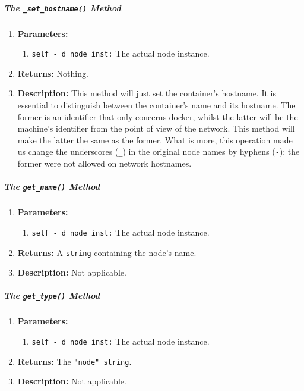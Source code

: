         \subparagraph{The \texttt{\_set\_hostname()} Method}
            \begin{enumerate}
                \item \textbf{Parameters:}
                \begin{enumerate}
                    \item \texttt{self - d\_node\_inst:} The actual node instance.
                \end{enumerate}
                \item \textbf{Returns:} Nothing.
                \item \textbf{Description:} This method will just set the container's hostname. It is essential to distinguish between the container's name and its hostname. The former is an identifier that only concerns docker, whilst the latter will be the machine's identifier from the point of view of the network. This method will make the latter the same as the former. What is more, this operation made us change the underscores (\texttt{\_}) in the original node names by hyphens (\texttt{-}): the former were not allowed on network hostnames.
            \end{enumerate}

        \subparagraph{The \texttt{get\_name()} Method}
            \begin{enumerate}
                \item \textbf{Parameters:}
                \begin{enumerate}
                    \item \texttt{self - d\_node\_inst:} The actual node instance.
                \end{enumerate}
                \item \textbf{Returns:} A \texttt{string} containing the node's name.
                \item \textbf{Description:} Not applicable.
            \end{enumerate}

        \subparagraph{The \texttt{get\_type()} Method}
            \begin{enumerate}
                \item \textbf{Parameters:}
                \begin{enumerate}
                    \item \texttt{self - d\_node\_inst:} The actual node instance.
                \end{enumerate}
                \item \textbf{Returns:} The \texttt{"node" string}.
                \item \textbf{Description:} Not applicable.
            \end{enumerate}

